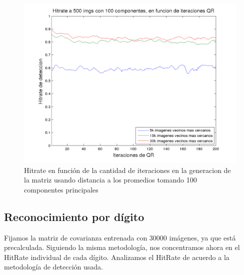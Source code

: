 \begin{figure}[H]
\begin {center}
\includegraphics[width=\hrwidth]{plots/HR_100_0.png}
\end {center}
\caption{Hitrate en funci\'on de la cantidad de iteraciones en la generacion de la matriz
usando distancia a los promedios tomando 100 componentes principales}
\label{fig:HR100Avg}
\end{figure}








\subsection{Reconocimiento por d\'igito}
Fijamos la matriz de covarianza entrenada con 30000 im\'agenes, ya que est\'a precalculada.
Siguiendo la misma metodolog\'ia, nos concentramos ahora en el HitRate individual
de cada d\'igito. Analizamos el HitRate de acuerdo a la metodolog\'ia de detecci\'on usada.

\def \pdwidth {500pt}

